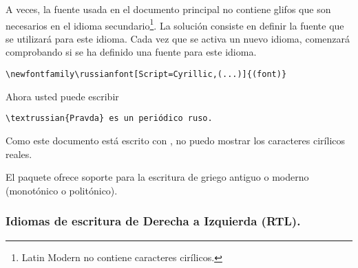 A veces, la fuente usada en el documento principal no contiene glifos que son 
necesarios en el idioma secundario\footnote{Latin Modern no contiene caracteres 
cirílicos.}. La solución consiste en definir la fuente que se utilizará para 
este idioma. Cada vez que se activa un nuevo idioma,  
comenzará comprobando si se ha definido una fuente para este idioma.

\begin{lscommand}
\verb|\newfontfamily\russianfont[Script=Cyrillic,(...)]{(font)}|
\end{lscommand}

Ahora usted puede escribir

\begin{lscommand} \verb|\textrussian{Pravda} es un periódico ruso.|
\end{lscommand}
%
Como este documento está escrito con , no puedo mostrar los 
caracteres cirílicos reales.

El paquete \cite{xgreek} ofrece soporte para la 
escritura de griego antiguo o moderno (monotónico o politónico).

\subsubsection{Idiomas de escritura de Derecha a Izquierda (RTL).}

